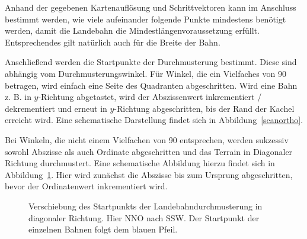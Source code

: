 \documentclass[10pt,a4paper]{report}
\begin{document}
Anhand der gegebenen Kartenauflösung und Schrittvektoren kann im Anschluss bestimmt werden, wie viele aufeinander folgende Punkte mindestens benötigt werden, damit die Landebahn die Mindestlängenvoraussetzung erfüllt.
Entsprechendes gilt natürlich auch für die Breite der Bahn.

Anschließend werden die Startpunkte der Durchmusterung bestimmt.
Diese sind abhängig vom Durchmusterungswinkel. 
Für Winkel, die ein Vielfaches von 90 betragen, wird einfach eine Seite des Quadranten abgeschritten. Wird eine Bahn z. B. in $y$-Richtung abgetastet, wird der Abszissenwert inkrementiert / dekrementiert und erneut in $y$-Richtung abgeschritten, bis der Rand der Kachel erreicht wird. Eine schematische Darstellung findet sich in Abbildung~\ref{scanortho}.

Bei Winkeln, die nicht einem Vielfachen von 90 entsprechen, werden sukzessiv sowohl Abszisse als auch Ordinate abgeschritten und das Terrain in Diagonaler Richtung durchmustert. 
Eine schematische Abbildung hierzu findet sich in Abbildung~\ref{scandiagonal}. Hier wird zunächst die Abszisse bis zum Ursprung abgeschritten, bevor der Ordinatenwert inkrementiert wird.

\begin{figure}\label{scandiagonal}
\centering
{}
\caption{Verschiebung des Startpunkts der Landebahndurchmusterung in diagonaler Richtung. Hier NNO nach SSW. Der Startpunkt der einzelnen Bahnen folgt dem blauen Pfeil.}
\end{figure}
\end{document}
